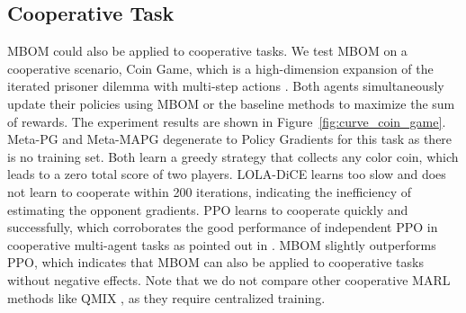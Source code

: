 \documentclass{article}
\begin{document}


\subsection{Cooperative Task}


MBOM could also be applied to cooperative tasks. We test MBOM on a cooperative scenario, Coin Game, which is a high-dimension expansion of the iterated prisoner dilemma with multi-step actions \citep{lerer2018maintaining, foerster2018learning}. Both agents simultaneously update their policies using MBOM or the baseline methods to maximize the sum of rewards. 
The experiment results are shown in Figure~\ref{fig:curve_coin_game}. Meta-PG and Meta-MAPG degenerate to Policy Gradients for this task as there is no training set. Both learn a greedy strategy that collects any color coin, which leads to a zero total score of two players. LOLA-DiCE learns too slow and does not learn to cooperate within 200 iterations, indicating the inefficiency of estimating the opponent gradients. 
PPO learns to cooperate quickly and successfully, which corroborates the good performance of independent PPO in cooperative multi-agent tasks as pointed out in \cite{deWitt2020independent,yu2021surprising}. MBOM slightly outperforms PPO, which indicates that MBOM can also be applied to cooperative tasks without negative effects. Note that we do not compare other cooperative MARL methods like QMIX \citep{QMIX}, as they require centralized training. 


\end{document}
